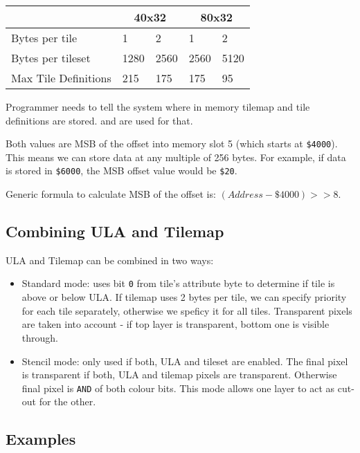 \documentclass[12pt,twoside,openright,a4paper]{book}
\begin{document}
{
	\def\arraystretch{1.2}
	\begin{tabular}{|l|l|l|l|l|}
		\hline
		& \multicolumn{2}{c|}{40x32} & \multicolumn{2}{c|}{80x32} \\
		\hline
		Bytes per tile & 1 & 2 & 1 & 2 \\
		\hline
		Bytes per tileset & 1280 & 2560 & 2560 & 5120 \\
		\hline
		Max Tile Definitions & 215 & 175 & 175 & 95 \\
		\hline
	\end{tabular}
}

Programmer needs to tell the system where in memory tilemap and tile definitions are stored.  and  are used for that.

Both values are MSB of the offset into memory slot 5 (which starts at {\tt \$4000}). This means we can store data at any multiple of 256 bytes. For example, if data is stored in {\tt \$6000}, the MSB offset value would be {\tt \$20}.

Generic formula to calculate MSB of the offset is: $(Address - \$4000) >> 8$.


\pagebreak
\subsection{Combining ULA and Tilemap}

ULA and Tilemap can be combined in two ways:

\begin{itemize}[topsep=1pt,itemsep=1pt]
	\item Standard mode: uses bit {\tt 0} from tile's attribute byte to determine if tile is above or below ULA. If tilemap uses 2 bytes per tile, we can specify priority for each tile separately, otherwise we speficy it for all tiles. Transparent pixels are taken into account - if top layer is transparent, bottom one is visible through.
	
	\item Stencil mode: only used if both, ULA and tileset are enabled. The final pixel is transparent if both, ULA and tilemap pixels are transparent. Otherwise final pixel is {\tt AND} of both colour bits. This mode allows one layer to act as cut-out for the other.
\end{itemize}


\subsection{Examples}
\end{document}
